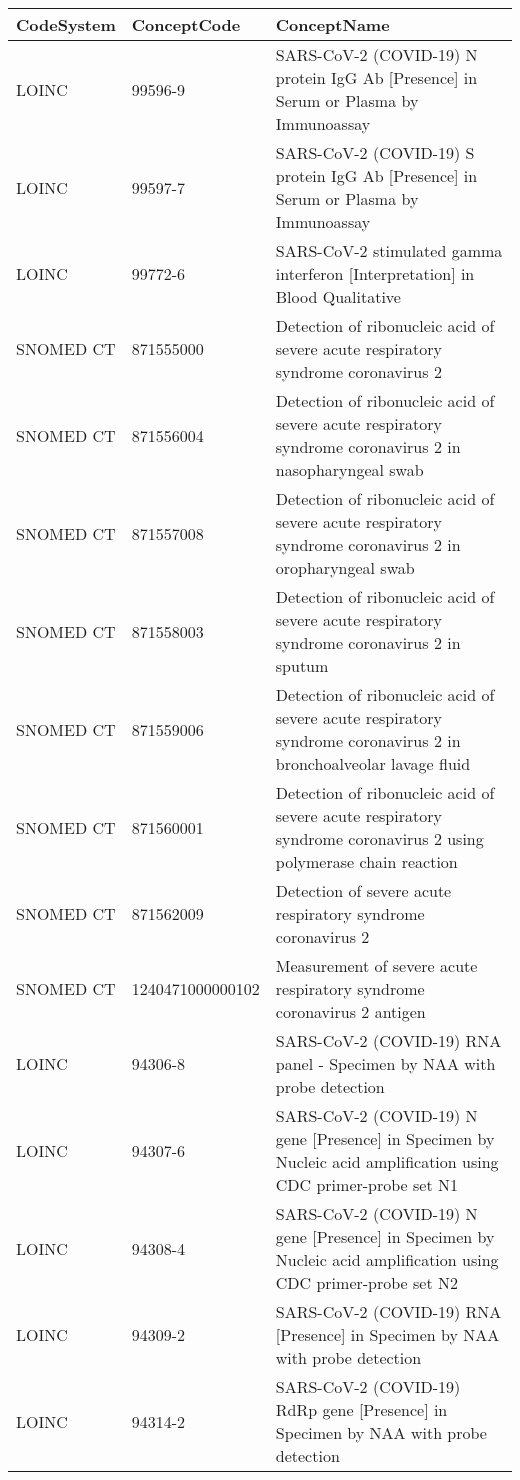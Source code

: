 \begin{table}[ht]
\centering
\begin{tabular}{lll}
  \hline
CodeSystem & ConceptCode & ConceptName \\ 
  \hline
LOINC & 99596-9 & SARS-CoV-2 (COVID-19) N protein IgG Ab [Presence] in Serum or Plasma by Immunoassay \\ 
  LOINC & 99597-7 & SARS-CoV-2 (COVID-19) S protein IgG Ab [Presence] in Serum or Plasma by Immunoassay \\ 
  LOINC & 99772-6 & SARS-CoV-2 stimulated gamma interferon [Interpretation] in Blood Qualitative \\ 
  SNOMED CT & 871555000 & Detection of ribonucleic acid of severe acute respiratory syndrome coronavirus 2 \\ 
  SNOMED CT & 871556004 & Detection of ribonucleic acid of severe acute respiratory syndrome coronavirus 2 in nasopharyngeal swab \\ 
  SNOMED CT & 871557008 & Detection of ribonucleic acid of severe acute respiratory syndrome coronavirus 2 in oropharyngeal swab \\ 
  SNOMED CT & 871558003 & Detection of ribonucleic acid of severe acute respiratory syndrome coronavirus 2 in sputum \\ 
  SNOMED CT & 871559006 & Detection of ribonucleic acid of severe acute respiratory syndrome coronavirus 2 in bronchoalveolar lavage fluid \\ 
  SNOMED CT & 871560001 & Detection of ribonucleic acid of severe acute respiratory syndrome coronavirus 2 using polymerase chain reaction \\ 
  SNOMED CT & 871562009 & Detection of severe acute respiratory syndrome coronavirus 2 \\ 
  SNOMED CT & 1240471000000102 & Measurement of severe acute respiratory syndrome coronavirus 2 antigen \\ 
  LOINC & 94306-8 & SARS-CoV-2 (COVID-19) RNA panel - Specimen by NAA with probe detection \\ 
  LOINC & 94307-6 & SARS-CoV-2 (COVID-19) N gene [Presence] in Specimen by Nucleic acid amplification using CDC primer-probe set N1 \\ 
  LOINC & 94308-4 & SARS-CoV-2 (COVID-19) N gene [Presence] in Specimen by Nucleic acid amplification using CDC primer-probe set N2 \\ 
  LOINC & 94309-2 & SARS-CoV-2 (COVID-19) RNA [Presence] in Specimen by NAA with probe detection \\ 
  LOINC & 94314-2 & SARS-CoV-2 (COVID-19) RdRp gene [Presence] in Specimen by NAA with probe detection \\ 

\end{tabular}
\end{table}
